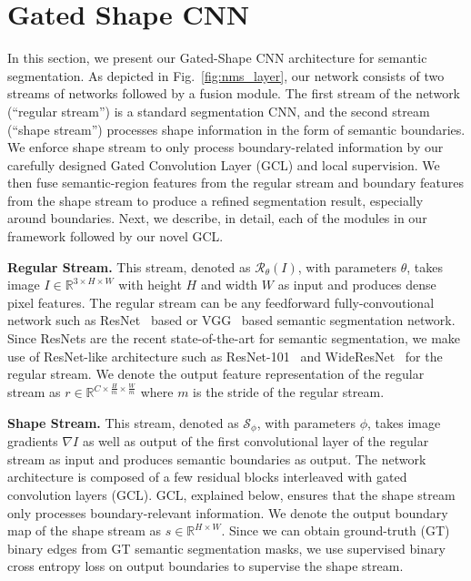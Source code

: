 \documentclass[10pt,twocolumn,letterpaper]{article}
\begin{document}
\vspace{-1mm}
 

\section{Gated Shape CNN}
\label{sec:method}

In this section, we present our Gated-Shape CNN architecture for semantic segmentation. 
As depicted in Fig.~\ref{fig:nms_layer}, our network consists of two streams of networks followed by a fusion module. 
The first stream of the network (``regular stream'') is a standard segmentation CNN, and the second stream (``shape stream'') processes shape information in the form of semantic boundaries. 
We enforce shape stream to only process boundary-related information by our carefully designed Gated Convolution Layer (GCL) and local supervision.
We then fuse semantic-region features from the regular stream and boundary features from the shape stream to produce a refined segmentation result, especially around boundaries.
Next, we describe, in detail, each of the modules in 
our framework 
followed by our novel GCL.

\vspace{1mm}
\noindent \textbf{Regular Stream.} This stream,
denoted as $\mathcal{R}_\theta(I)$, with parameters $\theta$, takes image $I \in \mathbb{R}^{3 \times H \times W}$ with height $H$ and width $W$ as input and produces dense pixel features. The regular stream can be any feedforward fully-convoutional network such as ResNet~\cite{he15deepresidual} based or VGG~\cite{vggcnn} based semantic segmentation network. Since ResNets are the recent state-of-the-art for semantic segmentation, we make use of ResNet-like architecture such as ResNet-101~\cite{he15deepresidual} and WideResNet~\cite{zagoruyko2016wide} for the regular stream.
We denote the output feature representation of the regular stream as $r \in \mathbb{R}^{C \times \frac{H}{m} \times \frac{W}{m}}$ where $m$ is the stride of the regular stream.

\vspace{1mm}
\noindent \textbf{Shape Stream.} 
This stream,
denoted as $\mathcal{S}_\phi$, with parameters $\phi$, takes image gradients $\nabla I$ as well as output of the first convolutional layer of the regular stream as input and produces semantic boundaries as output.
The network architecture is composed of a few residual blocks interleaved with gated convolution layers (GCL). GCL, explained below, ensures that the shape stream only processes boundary-relevant information.
We denote the output boundary map of the shape stream as $s \in \mathbb{R}^{H \times W}$.
Since we can obtain ground-truth (GT) binary edges from GT semantic segmentation masks, we use supervised
binary cross entropy loss on output boundaries to supervise the shape stream.
\end{document}
